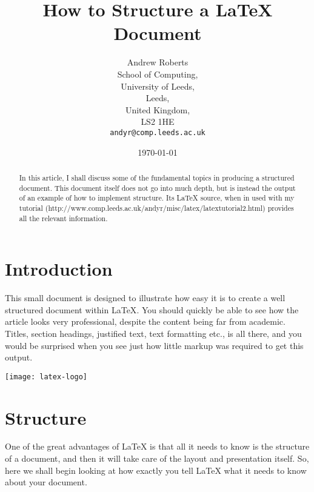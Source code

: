 \documentclass{article}
\begin{document}
 
\title{How to Structure a \LaTeX{} Document} %
\author{Andrew Roberts\\
        School of Computing,\\
        University of Leeds,\\
        Leeds,\\
        United Kingdom,\\
        LS2 1HE\\
        \texttt{andyr@comp.leeds.ac.uk}}  %
\date{\today}  %
\maketitle
 
\begin{abstract}
In this article, I shall discuss some of the fundamental topics in
producing a structured document.  This document itself does not go into
much depth, but is instead the output of an example of how to implement
structure. Its \LaTeX{} source, when in used with my tutorial
(http://www.comp.leeds.ac.uk/andyr/misc/latex/\-latextutorial2.html)
provides all the relevant information.  \end{abstract}
 
\section{Introduction}
This small document is designed to illustrate how easy it is to create a
well structured document within \LaTeX\cite{lamport94}.  You should quickly be able to
see how the article looks very professional, despite the content being
far from academic.  Titles, section headings, justified text, text
formatting etc., is all there, and you would be surprised when you see
just how little markup was required to get this output.
 
\begin{center}
    \texttt{[image: latex-logo]}
\end{center}
 
\section{Structure}
One of the great advantages of \LaTeX{} is that all it needs to know is
the structure of a document, and then it will take care of the layout
and presentation itself.  So, here we shall begin looking at how exactly
you tell \LaTeX{} what it needs to know about your document.
 
\end{document}

